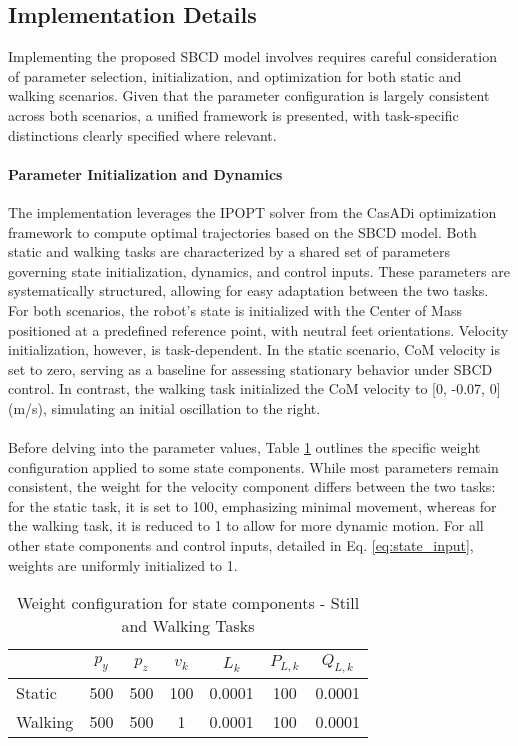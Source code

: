 \documentclass[main.tex]{subfiles}
\begin{document}
\begin{sloppypar}
\subsection{Implementation Details}
Implementing the proposed SBCD model involves requires careful consideration of parameter selection, initialization, and optimization for both static and walking scenarios. Given that the parameter configuration is largely consistent across both scenarios, a unified framework is presented, with task-specific distinctions clearly specified where relevant.
\paragraph{Parameter Initialization and Dynamics} The implementation leverages the IPOPT solver from the CasADi optimization framework to compute optimal trajectories based on the SBCD model. Both static and walking tasks are characterized by a shared set of parameters governing state initialization, dynamics, and control inputs. These parameters are systematically structured, allowing for easy adaptation between the two tasks. For both scenarios, the robot’s state is initialized with the Center of Mass positioned at a predefined reference point, with neutral feet orientations. Velocity initialization, however, is task-dependent. In the static scenario, CoM velocity is set to zero, serving as a baseline for assessing stationary behavior under SBCD control. In contrast, the walking task initialized the CoM velocity to [0, -0.07, 0]  (m/s), simulating an initial oscillation to the right. \\ 
\\
Before delving into the parameter values, Table \ref{tab:weight_states} outlines the specific weight configuration applied to some state components. While most parameters remain consistent, the weight for the velocity component differs between the two tasks: for the static task, it is set to 100, emphasizing minimal movement, whereas for the walking task, it is reduced to 1 to allow for more dynamic motion. For all other state components and control inputs, detailed in Eq. \ref{eq:state_input}, weights are uniformly initialized to 1.
\begin{table}[h!]
    \centering
    \begin{tabular}{lcccccc}
    \toprule
    & $p_y$ & $p_z$ & $v_k$ & $L_k$ & $P_{L,k}$ & $Q_{L,k}$ \\
    \midrule
    Static & 500 & 500 & 100 & 0.0001 & 100 & 0.0001 \\
    Walking & 500 & 500 & 1 & 0.0001 & 100 & 0.0001 \\
    \bottomrule
    \end{tabular}
    \caption{Weight configuration for state components - Still and Walking Tasks}
    \label{tab:weight_states}
\end{table}

\end{sloppypar}
\end{document}
